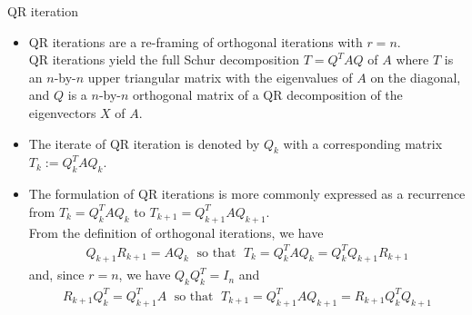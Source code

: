 \documentclass[t,usepdftitle=false]{beamer}
\begin{document}
\begin{frame}{QR iteration}
\begin{itemize}
\item QR iterations are a re-framing of orthogonal iterations with $r=n$.\vspace{.1cm}\\
QR iterations yield the full Schur decomposition $T=Q^TAQ$ of $A$ where $T$ is an $n$-by-$n$ upper triangular matrix with the eigenvalues of $A$ on the diagonal, and $Q$ is a $n$-by-$n$ orthogonal matrix of a QR decomposition of the eigenvectors $X$ of $A$.
\item The iterate of QR iteration is denoted by $Q_k$ with a corresponding matrix $T_k:=Q_k^TAQ_k$.
\item The formulation of QR iterations is more commonly expressed as a recurrence from $T_k=Q_k^TAQ_k$ to $T_{k+1}=Q_{k+1}^TAQ_{k+1}$.\vspace{.1cm}\\
From the definition of orthogonal iterations, we have
\begin{align*}
Q_{k+1}R_{k+1}=AQ_k
\;\text{ so that }\;
T_k=Q_k^TAQ_k=Q_k^TQ_{k+1}R_{k+1}
\end{align*}
and, since $r=n$, we have $Q_kQ_k^T=I_n$ and
\begin{align*}
R_{k+1}Q_k^T=Q_{k+1}^TA
\;\text{ so that }\;
T_{k+1}=Q_{k+1}^TAQ_{k+1}=R_{k+1}Q_k^TQ_{k+1}
\end{align*}
\end{itemize}
\end{frame}
\end{document}
